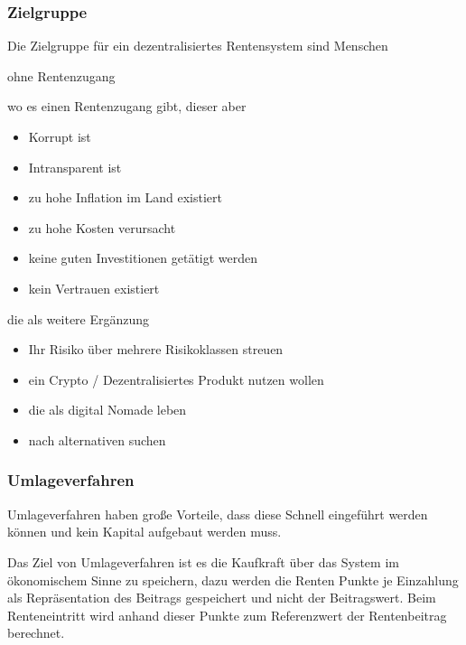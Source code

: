 \subsubsection*{Zielgruppe}
Die Zielgruppe für ein dezentralisiertes Rentensystem sind Menschen

\begin{compactenum}
\item ohne Rentenzugang
\item wo es einen Rentenzugang gibt, dieser aber 
 \begin{itemize}
 \item Korrupt ist
 \item Intransparent ist
 \item zu hohe Inflation im Land existiert
 \item zu hohe Kosten verursacht
 \item keine guten Investitionen getätigt werden
 \item kein Vertrauen existiert
 \end{itemize}
\item die als weitere Ergänzung 
 \begin{itemize}
 \item Ihr Risiko über mehrere Risikoklassen streuen
 \item ein Crypto / Dezentralisiertes Produkt nutzen wollen
 \item die als digital Nomade leben
 \item nach alternativen suchen
 \end{itemize}
\end{compactenum}

\subsubsection*{Umlageverfahren}


Umlageverfahren haben große Vorteile, dass diese Schnell eingeführt werden können und kein Kapital aufgebaut werden muss.

Das Ziel von Umlageverfahren ist es die Kaufkraft über das System im ökonomischem Sinne zu speichern, dazu werden die Renten Punkte je Einzahlung als Repräsentation des Beitrags gespeichert und nicht der Beitragswert.
Beim Renteneintritt wird anhand dieser Punkte zum Referenzwert der Rentenbeitrag berechnet. 


